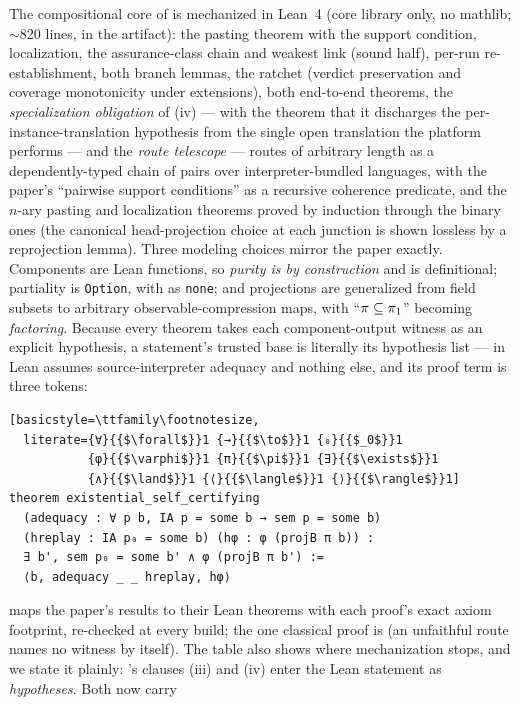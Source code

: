 The compositional core of  is
mechanized in Lean~4 (core library only, no mathlib; $\sim$820 lines,
in the artifact): the pasting theorem with the support condition,
localization, the assurance-class chain and weakest link (sound half),
per-run re-establishment, both branch lemmas, the ratchet (verdict
preservation and coverage monotonicity under extensions), both
end-to-end theorems, the \emph{specialization obligation} of
(iv) --- with the theorem that it discharges the
per-instance-translation hypothesis from the single open translation
the platform performs --- and the \emph{route telescope} --- routes of
arbitrary length as a dependently-typed chain of pairs over
interpreter-bundled languages, with the paper's ``pairwise support
conditions'' as a recursive coherence predicate, and the $n$-ary
pasting and localization theorems proved by induction through the
binary ones (the canonical head-projection choice at each junction is
shown lossless by a reprojection lemma). Three modeling
choices mirror the paper exactly. Components are Lean functions, so
\emph{purity is by construction} and  is
definitional; partiality is \texttt{Option}, with \unsupported{} as
\texttt{none}; and projections are generalized from field subsets to
arbitrary observable-compression maps, with ``$\pi \subseteq
\pi_1$'' becoming \emph{factoring}. Because every theorem takes each
component-output witness as an explicit hypothesis, a statement's
trusted base is literally its hypothesis list ---
 in Lean assumes source-interpreter adequacy and
nothing else, and its proof term is three tokens:
\begin{lstlisting}[basicstyle=\ttfamily\footnotesize,
  literate={∀}{{$\forall$}}1 {→}{{$\to$}}1 {₀}{{$_0$}}1
           {φ}{{$\varphi$}}1 {π}{{$\pi$}}1 {∃}{{$\exists$}}1
           {∧}{{$\land$}}1 {⟨}{{$\langle$}}1 {⟩}{{$\rangle$}}1]
theorem existential_self_certifying
  (adequacy : ∀ p b, IA p = some b → sem p = some b)
  (hreplay : IA p₀ = some b) (hφ : φ (projB π b)) :
  ∃ b', sem p₀ = some b' ∧ φ (projB π b') :=
  ⟨b, adequacy _ _ hreplay, hφ⟩
\end{lstlisting}
 maps the paper's results to their Lean theorems with
each proof's exact axiom footprint, re-checked at every build; the one
classical proof is  (an unfaithful route names
no witness by itself). The table also shows where mechanization stops,
and we state it plainly: 's clauses (iii) and (iv)
enter the Lean statement as \emph{hypotheses}. Both now carry
